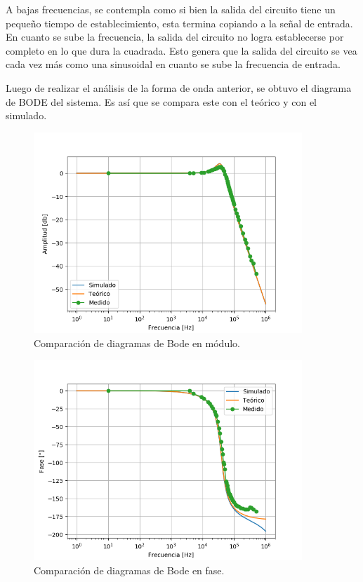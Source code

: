 A bajas frecuencias, se contempla como si bien la salida del circuito tiene un pequeño tiempo de establecimiento, esta termina copiando a la señal de entrada. En cuanto se sube la frecuencia, la salida del circuito no logra establecerse por completo en lo que dura la cuadrada. Esto genera que la salida del circuito se vea cada vez más como una sinusoidal en cuanto se sube la frecuencia de entrada.

Luego de realizar el análisis de la forma de onda anterior, se obtuvo el diagrama de BODE del sistema. Es así que se compara este con el teórico y con el simulado.

\begin{figure}[H]
	\centering
	\includegraphics[width=0.9\textwidth]{Ejercicio2/Mediciones/Modulo.png}
\caption{Comparación de diagramas de Bode en módulo.}
	\label{fig:bodemod}
\end{figure}
\begin{figure}[H]
	\centering
	\includegraphics[width=0.9\textwidth]{Ejercicio2/Mediciones/Fase.png}
\caption{Comparación de diagramas de Bode en fase.}
	\label{fig:bodefase}
\end{figure}

